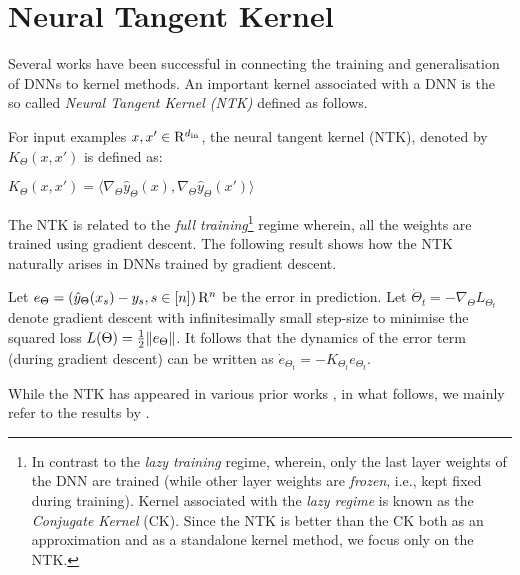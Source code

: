 \section{Neural Tangent Kernel}
Several works \cite{ntk,fcgp,convgp,arora2019exact,arora} have been successful in connecting the training and generalisation of DNNs to kernel methods. An important kernel associated with a DNN is the so called \emph{Neural Tangent Kernel (NTK)} defined as follows.
\begin{definition}\label{def:ntk}
 For input examples $x,x'\in\mathrm{R}^{d_{\text{in}}}$, the neural tangent kernel (NTK), denoted by $K_{\Theta}(x,x')$ is defined as:
\centerline{$
K_{\Theta}(x,x') = \langle\nabla_{\Theta} \hat{y}_{\Theta}(x), \nabla_{\Theta} \hat{y}_{\Theta}(x') \rangle
$}
\end{definition}
The NTK is related to the \emph{full training}\footnote{In contrast to the \emph{lazy training} regime, wherein, only the last layer weights of the DNN are trained (while other layer weights are \emph{frozen}, i.e., kept fixed during training). Kernel associated with the \emph{lazy regime} is known as the \emph{Conjugate Kernel} (CK). Since the NTK  \cite{arora2019exact} is better than the CK \cite{convgp} both as an approximation and as a standalone kernel method, we focus only on the NTK.}  regime wherein, all the weights are trained using gradient descent. The following result shows how the NTK naturally arises in DNNs trained by gradient descent.
\begin{proposition}\label{prop:basic}
Let $e_{\Theta}=\left(\hat{y}_{\Theta}(x_s)-y_s,s\in[n]\right)\mathrm{R}^n$ be the error in prediction. Let $\dot{\Theta}_t=-\nabla_{\Theta}L_{\Theta_t}$ denote gradient descent  with infinitesimally small step-size to minimise the  squared loss $L(\Theta)=\frac{1}{2}\|e_{\Theta}\|$. It follows that the dynamics of the error term (during gradient descent) can be written as $\dot{e}_{\Theta_t}=-K_{\Theta_t} e_{\Theta_t}$. 
\end{proposition}
While the NTK has appeared in various prior works \cite{ntk,dudnn,arora2019exact,cao2019generalization}, in what follows, we mainly refer to the results by \citet{arora2019exact}. 

